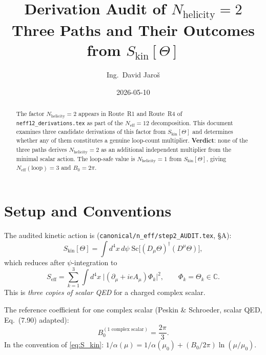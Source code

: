 \documentclass[12pt,a4paper]{article}
\title{Derivation Audit of $N_{\mathrm{helicity}} = 2$\\
       \large Three Paths and Their Outcomes from $S_{\mathrm{kin}}[\Theta]$}
\author{Ing.\ David Jaro\v{s}}
\date{2026-05-10}
\theoremstyle{remark}
\newcommand{\Neff}{N_{\mathrm{eff}}}
\newcommand{\Nhelicity}{N_{\mathrm{helicity}}}
\begin{document}
\maketitle

\begin{abstract}
The factor $\Nhelicity = 2$ appears in Route~R1 and Route~R4 of
\texttt{neff12\_derivations.tex} as part of the $N_{\mathrm{eff}} = 12$
decomposition.  This document examines three candidate derivations
of this factor from $S_{\mathrm{kin}}[\Theta]$ and determines whether
any of them constitutes a genuine loop-count multiplier.
\textbf{Verdict}: none of the three paths derives $\Nhelicity = 2$ as an
additional independent multiplier from the minimal scalar action.
The loop-safe value is $\Nhelicity = 1$ from $S_{\mathrm{kin}}[\Theta]$,
giving $\Neff(\mathrm{loop}) = 3$ and $B_0 = 2\pi$.
\end{abstract}

\tableofcontents

\section{Setup and Conventions}
\label{sec:setup}

The audited kinetic action is (\texttt{canonical/n\_eff/step2\_AUDIT.tex}, §A):
\begin{equation}
  S_{\mathrm{kin}}[\Theta]
  = \int d^4x\,d\psi\;
  \mathrm{Sc}\!\bigl[(D_\mu\Theta)^\dagger(D^\mu\Theta)\bigr],
  \label{eq:S_kin}
\end{equation}
which reduces after $\psi$-integration to
\begin{equation}
  S_{\mathrm{eff}} = \sum_{k=1}^{3}
  \int d^4x\;\bigl|({\partial}_\mu + ieA_\mu)\Phi_k\bigr|^2,
  \qquad \Phi_k = \Theta_k \in \mathbb{C}.
  \label{eq:S_eff}
\end{equation}
This is \emph{three copies of scalar QED} for a charged complex scalar.

The reference coefficient for one complex scalar (Peskin \& Schroeder,
scalar QED, Eq.~(7.90) adapted):
\begin{equation}
  B_0^{(1\text{ complex scalar})} = \frac{2\pi}{3}.
  \label{eq:baseline}
\end{equation}
In the convention of \eqref{eq:S_kin}:
$1/\alpha(\mu) = 1/\alpha(\mu_0) + (B_0/2\pi)\ln(\mu/\mu_0)$.
\end{document}
